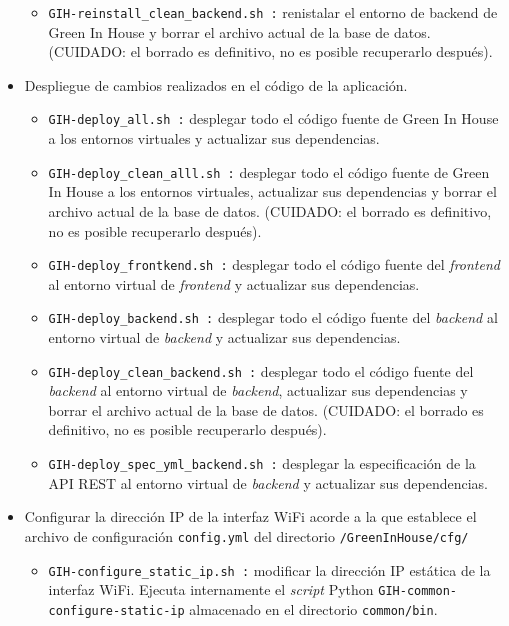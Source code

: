 \begin{itemize}
\begin{itemize}
                \item \texttt{GIH-reinstall\_clean\_backend.sh :} renistalar el entorno de backend de Green In House y borrar el archivo actual de la base de datos. 
                \color{red}(CUIDADO: el borrado es definitivo, no es posible recuperarlo después). \color{black}
            \end{itemize}
            \item Despliegue de cambios realizados en el código de la aplicación. 
            \begin{itemize}
                \item \texttt{GIH-deploy\_all.sh :} desplegar todo el código fuente de Green In House a los entornos virtuales y actualizar sus dependencias.
                \item \texttt{GIH-deploy\_clean\_alll.sh :} desplegar todo el código fuente de Green In House a los entornos virtuales, actualizar sus dependencias y borrar el archivo actual de la base de datos.
                \color{red}(CUIDADO: el borrado es definitivo, no es posible recuperarlo después). \color{black}
                \item \texttt{GIH-deploy\_frontkend.sh :} desplegar todo el código fuente del \textit{frontend} al entorno virtual de \textit{frontend} y actualizar sus dependencias.
                \item \texttt{GIH-deploy\_backend.sh :} desplegar todo el código fuente del \textit{backend} al entorno virtual de \textit{backend} y actualizar sus dependencias.
                \item \texttt{GIH-deploy\_clean\_backend.sh :} desplegar todo el código fuente del \textit{backend} al entorno virtual de \textit{backend}, actualizar sus dependencias y borrar el archivo actual de la base de datos.
                \color{red}(CUIDADO: el borrado es definitivo, no es posible recuperarlo después). \color{black}
                \item \texttt{GIH-deploy\_spec\_yml\_backend.sh :} desplegar la especificación de la API REST al entorno virtual de \textit{backend} y actualizar sus dependencias.
            \end{itemize}  
            \item Configurar la dirección IP de la interfaz WiFi acorde a la que establece el archivo de configuración \texttt{config.yml} del directorio \texttt{/GreenInHouse/cfg/}
            \begin{itemize}
                \item \texttt{GIH-configure\_static\_ip.sh :} modificar la dirección IP estática de la interfaz WiFi. Ejecuta internamente el \textit{script} Python \texttt{GIH-common-configure-static-ip} almacenado en el directorio \texttt{common/bin}.

\end{itemize}
\end{itemize}
